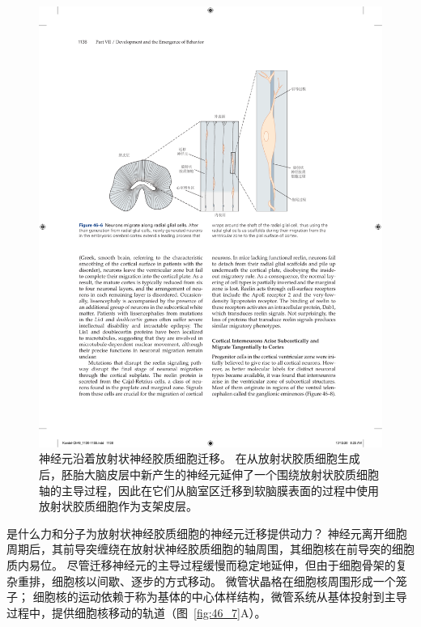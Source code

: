 \begin{figure}[htbp]
	\centering
	\includegraphics[width=1.0\linewidth]{chap46/fig_46_6}
	\caption{神经元沿着放射状神经胶质细胞迁移。
		在从放射状胶质细胞生成后，胚胎大脑皮层中新产生的神经元延伸了一个围绕放射状胶质细胞轴的主导过程，因此在它们从脑室区迁移到软脑膜表面的过程中使用放射状胶质细胞作为支架皮层。}
	\label{fig:46_6}
\end{figure}


是什么力和分子为放射状神经胶质细胞的神经元迁移提供动力？
神经元离开细胞周期后，其前导突缠绕在放射状神经胶质细胞的轴周围，其细胞核在前导突的细胞质内易位。
尽管迁移神经元的主导过程缓慢而稳定地延伸，但由于细胞骨架的复杂重排，细胞核以间歇、逐步的方式移动。 
微管状晶格在细胞核周围形成一个笼子；
细胞核的运动依赖于称为基体的中心体样结构，微管系统从基体投射到主导过程中，提供细胞核移动的轨道（图~\ref{fig:46_7}A）。


